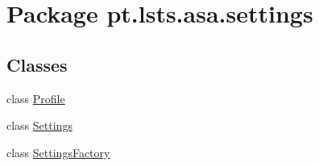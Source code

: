 \hypertarget{namespacept_1_1lsts_1_1asa_1_1settings}{}\section{Package pt.\+lsts.\+asa.\+settings}
\label{namespacept_1_1lsts_1_1asa_1_1settings}
\subsection*{Classes}
\begin{DoxyCompactItemize}
\item 
class \hyperlink{classpt_1_1lsts_1_1asa_1_1settings_1_1Profile}{Profile}
\item 
class \hyperlink{classpt_1_1lsts_1_1asa_1_1settings_1_1Settings}{Settings}
\item 
class \hyperlink{classpt_1_1lsts_1_1asa_1_1settings_1_1SettingsFactory}{Settings\+Factory}
\end{DoxyCompactItemize}
